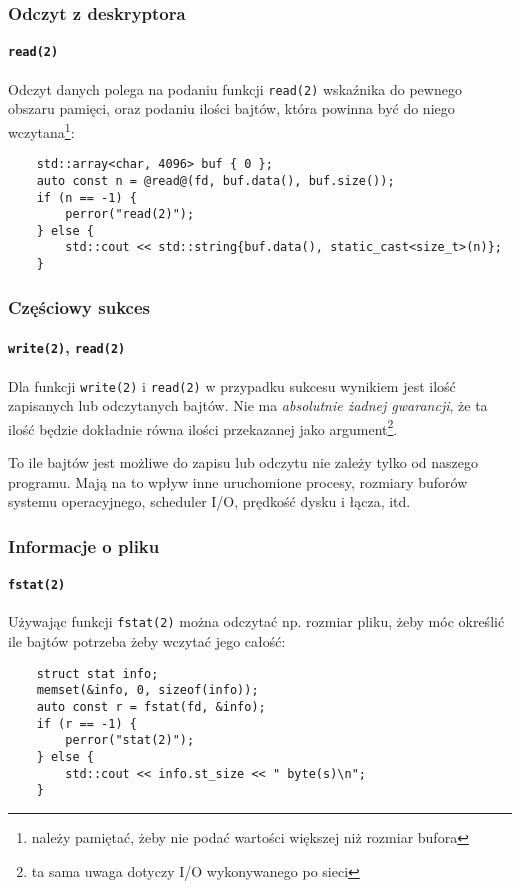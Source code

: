 \documentclass[aspectratio=169]{beamer}
\begin{document}
\begin{frame}[fragile]
    \frametitle{Odczyt z deskryptora}
    \framesubtitle{\texttt{read(2)}}

    Odczyt danych polega na podaniu funkcji \texttt{read(2)} wskaźnika do
    pewnego obszaru pamięci, oraz podaniu ilości bajtów, która powinna być do
    niego wczytana\footnote{należy pamiętać, żeby nie podać wartości większej
    niż rozmiar bufora}:

    {\footnotesize
    \begin{lstlisting}
    std::array<char, 4096> buf { 0 };
    auto const n = @read@(fd, buf.data(), buf.size());
    if (n == -1) {
        perror("read(2)");
    } else {
        std::cout << std::string{buf.data(), static_cast<size_t>(n)};
    }
    \end{lstlisting}}
\end{frame}

\begin{frame}
    \frametitle{Częściowy sukces}
    \framesubtitle{\texttt{write(2)}, \texttt{read(2)}}

    Dla funkcji \texttt{write(2)} i \texttt{read(2)} w przypadku sukcesu
    wynikiem jest ilość zapisanych lub odczytanych bajtów. Nie ma
    \emph{absolutnie żadnej gwarancji}, że ta ilość będzie dokładnie równa
    ilości przekazanej jako argument\footnote{ta sama uwaga dotyczy I/O
    wykonywanego po sieci}.

    \vspace{1em}

    To ile bajtów jest możliwe do zapisu lub odczytu nie zależy tylko od
    naszego programu. Mają na to wpływ inne uruchomione procesy, rozmiary
    buforów systemu operacyjnego, scheduler I/O, prędkość dysku i łącza, itd.
\end{frame}

\begin{frame}[fragile]
    \frametitle{Informacje o pliku}
    \framesubtitle{\texttt{fstat(2)}}

    Używając funkcji \texttt{fstat(2)} można odczytać np. rozmiar pliku, żeby
    móc określić ile bajtów potrzeba żeby wczytać jego całość:

    {\footnotesize
    \begin{lstlisting}
    struct stat info;
    memset(&info, 0, sizeof(info));
    auto const r = fstat(fd, &info);
    if (r == -1) {
        perror("stat(2)");
    } else {
        std::cout << info.st_size << " byte(s)\n";
    }
    \end{lstlisting}}
\end{frame}
\end{document}
